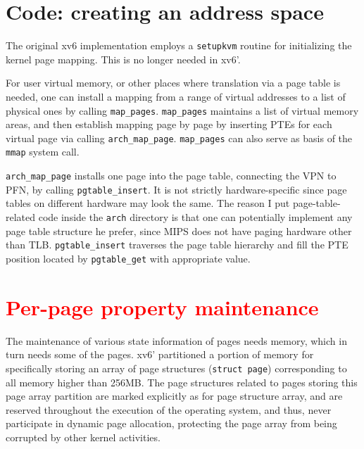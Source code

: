 \documentclass{report}
\def \hilite#1{\textcolor{red}{#1}}
\newenvironment{hilight}{\color{red}}{\color{black}}
\begin{document}
	\section{Code: creating an address space}
	\begin{hilight}
		The original xv6 implementation employs a \texttt{setupkvm} routine for initializing the
		kernel page mapping.  This is no longer needed in xv6'.
		
		For user virtual memory, or other places where translation via a page table is needed,
		one can install a mapping from a range of virtual addresses to a list of physical ones
		by calling \texttt{map\_pages}.
		\marginpar{
			\footnotesize\ttfamily
			\hilite{kern/mm/vm.c:126}
		}  \texttt{map\_pages} maintains a list of virtual memory areas, and then establish
		mapping page by page by inserting PTEs for each virtual page via calling \texttt{arch\_map\_page}.
		\texttt{map\_pages} can also serve as basis of the \texttt{mmap} system call.
		
		\texttt{arch\_map\_page}
		\marginpar{
			\footnotesize\ttfamily
			\hilite{arch/mips/mm/hier/\\pgtable.c:238}
		} installs one page into the page table, connecting the VPN to PFN, by calling \texttt{pgtable\_insert}.
		\marginpar{
			\footnotesize\ttfamily
			\hilite{arch/mips/mm/hier/\\pgtable.c:154}
		}
		It is not strictly hardware-specific since page tables on different hardware may look the same.
		The reason I put page-table-related code inside the \texttt{arch} directory is that one
		can potentially implement any page table structure he prefer, since MIPS does not have
		paging hardware other than TLB. \texttt{pgtable\_insert} traverses the page table hierarchy and
		fill the PTE position located by \texttt{pgtable\_get}
		\marginpar{
			\footnotesize\ttfamily
			\hilite{arch/mips/mm/hier/\\pgtable.c:88}
		} with appropriate value.
	\end{hilight}
	
	\section{\hilite{Per-page property maintenance}}
	\marginpar{
		\footnotesize\ttfamily
		\hilite{
			kern/mm/init.c\\
			include/mm/mmap.h
		}
	}
	\begin{hilight}
		The maintenance of various state information of pages needs memory, which in turn needs some of the
		pages.  xv6' partitioned a portion of memory for specifically storing an array of page structures
		(\texttt{struct page})
		corresponding to all memory higher than 256MB.  The page structures related to pages storing this page
		array partition are marked explicitly as for page structure array, and are reserved throughout the execution
		of the operating system, and thus, never participate in dynamic page allocation, protecting the page array
		from being corrupted by other kernel activities.
	\end{hilight}
	
\end{document}
